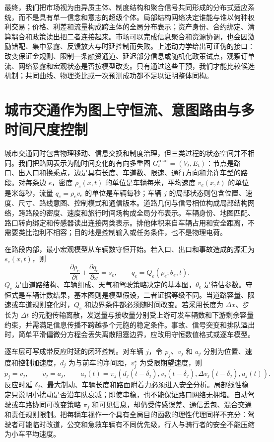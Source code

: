 最终，我们把市场视为由异质主体、制度结构和聚合信号共同形成的分布式适应系统，而不是具有单一信念和意志的超级个体。局部结构网络决定谁能与谁以何种权利交易；价格、利差和流量构成跨主体的全局分布表示；资产身份、合约绑定、清算耦合和政策读出把二者连接起来。市场可以完成信息聚合和资源协调，也会因激励错配、集中暴露、反馈放大与时延控制而失败。上述动力学给出可证伪的接口：改变保证金规则、限制一条融资通道、延迟部分信息或随机化政策试点，观察订单流、网络暴露和宏观状态是否按模型改变。只有通过这些干预，我们才能比较候选机制；共同曲线、物理类比或一次预测成功都不足以证明整体同构。

\section{城市交通作为图上守恒流、意图路由与多时间尺度控制}
\label{sec:section_9110}

城市交通同时包含物理移动、信息交换和制度治理，但三类过程的状态空间并不相同。我们把路网表示为随时间变化的有向多重图 $G_t^{\mathrm{road}}=(V_t,E_t)$：节点是路口、出入口和换乘点，边是具有长度、车道数、限速、通行方向和允许车型的路段。对每条边 $e$，密度 $\rho_e(x,t)$ 的单位是车辆每米，平均速度 $v_e(x,t)$ 的单位是米每秒，流量 $q_e=\rho_e v_e$ 的单位是车辆每秒；车辆 $j$ 的局部状态则包含位置、速度、尺寸、路线意图、控制模式和通信版本。道路几何与信号相位构成局部结构网络，跨路段的密度、速度和旅行时间场构成全局分布表示。车辆身份、地图匹配、路口转向绑定和传感器读出连接两类表示。排他体积来自车辆占用和安全距离，不需要类比泡利不相容；目的地是控制输入或任务条件，也不是物理电荷。

在路段内部，最小宏观模型从车辆数守恒开始。若入口、出口和事故造成的源汇为 $s_e(x,t)$，则
\[
\frac{\partial \rho_e}{\partial t}
+\frac{\partial q_e}{\partial x}=s_e,
\qquad
q_e=Q_e(\rho_e;\theta_e,t).
\]
$Q_e$ 是由道路结构、车辆组成、天气和驾驶策略决定的基本图，$\theta_e$ 是待估参数。守恒式是车辆计数结果，基本图则是模型假设，二者证据等级不同。当道路容量、限速或车道规则变化时，$Q_e$ 和边界条件都必须随时间改变。若采用长度为 $\Delta x$、步长为 $\Delta t$ 的元胞传输离散，发送量与接收量分别受上游可发车辆数和下游剩余容量约束，并需满足信息传播不跨越多个元胞的稳定条件。事故、信号突变和排队溢出时，简单平滑偏微分方程会丢失离散阻塞边界，应改用守恒数值格式或逐车模型。

逐车层可写成带反应时延的闭环控制。对车辆 $j$，令 $p_j$、$v_j$ 和 $a_j$ 分别为位置、速度和控制加速度，$d_j$ 为与前车的净间距，$v_j^{\star}$ 为受限期望速度，则
\[
\dot p_j=v_j,
\qquad
\dot v_j=a_j,
\qquad
a_j(t)=\pi_j(d_j(t-\delta_j),v_j(t-\delta_j),
\Delta v_j(t-\delta_j),u_j(t)).
\]
反应时延 $\delta_j$、最大制动、车辆长度和路面附着力必须进入安全分析。局部线性稳定只说明小扰动是否沿车队衰减；即使串稳，也不能保证路口网络无拥堵。自动驾驶或车路协同可改变策略 $\pi_j$ 和可见信息，却仍受传感误差、通信丢包、混合交通和责任规则限制。把每辆车视作一个具有全局目的函数的理性代理同样不充分：驾驶者可能临时改道，公交和急救车辆有不同优先级，行人与骑行者的安全不能压缩为小车平均速度。

